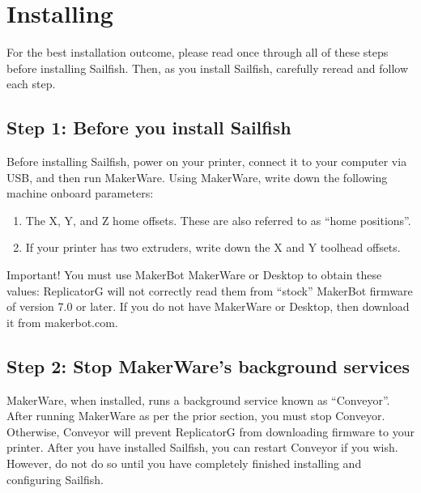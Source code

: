 
\section{Installing}

For the best installation outcome, please read once through all of these
steps before installing Sailfish.  Then, as you install Sailfish, carefully
reread and follow each step.


\subsection{Step 1: Before you install Sailfish} \label{sec:preinstall}

Before installing Sailfish, power on your printer, connect it to your computer
via USB, and then run MakerWare.  Using MakerWare, write down the following
machine onboard parameters:

\begin{enumerate}
\item The X, Y, and Z home offsets.  These are also referred to
  as ``home positions''.
\item If your printer has two extruders, write down the X and Y toolhead
  offsets.
\end{enumerate}

\begin{bclogo}[logo=\bcattention, noborder=true, couleurBarre=red]{Important!}
You must use MakerBot MakerWare or Desktop to obtain these values: ReplicatorG
will not correctly read them from ``stock'' MakerBot firmware of version 7.0
or later.  If you do not have MakerWare or Desktop, then download it from
makerbot.com.
\end{bclogo}


\subsection{Step 2: Stop MakerWare's background services} \label{sec:conveyor}

MakerWare, when installed, runs a background service known as ``Conveyor''.
After running MakerWare as per the prior section, you must stop Conveyor.
Otherwise, Conveyor will prevent ReplicatorG from downloading firmware to
your printer.  After you have installed Sailfish, you can restart Conveyor if
you wish.  However, do not do so until you have completely finished installing
and configuring Sailfish.

